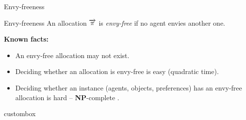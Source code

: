 \documentclass[9pt,english]{beamer}
\begin{document}
\begin{frame}{Envy-freeness}
  \begin{bibunit}[apalike]
    \begin{block}{Envy-freeness}
      An allocation $\overrightarrow{\pi}$ is \emph{envy-free} if no agent envies
      another one.
    \end{block}
    
    \textbf{Known facts:}
    \begin{itemize}
    \item An envy-free allocation may not exist.
    \item Deciding whether an allocation is envy-free is easy
      (quadratic time).
    \item Deciding whether an instance (agents, objects, preferences)
      has an envy-free allocation is hard -- \textbf{NP}-complete
      \cite{Lipton04}.
    \end{itemize}

    \vfill

    \begin{beamercolorbox}[wd=\textwidth,sep=1ex]{custombox}%
    \end{beamercolorbox}
    

        
  \end{bibunit}
\end{frame}
\end{document}
